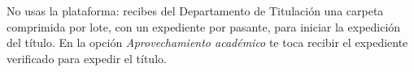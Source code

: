\documentclass[11pt,a4paper]{article}
\begin{document}
{\small\tableofcontents}
\newpage
\begin{quevasahacer}
No usas la plataforma: recibes del Departamento de Titulación una carpeta comprimida por lote, con un expediente por pasante, para iniciar la expedición del título. En la opción \emph{Aprovechamiento académico} te toca recibir el expediente verificado para expedir el título.
\end{quevasahacer}



\end{document}
